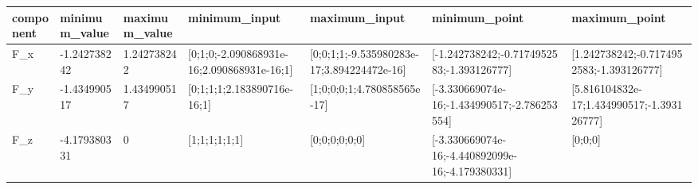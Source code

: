 \begin{tabular}{@{}lllllll@{}}
\toprule
component & minimum\_value & maximum\_value & minimum\_input & maximum\_input & minimum\_point & maximum\_point \\
\midrule
F\_x & -1.242738242 & 1.242738242 & [0;1;0;-2.090868931e-16;2.090868931e-16;1] & [0;0;1;1;-9.535980283e-17;3.894224472e-16] & [-1.242738242;-0.7174952583;-1.393126777] & [1.242738242;-0.7174952583;-1.393126777] \\
F\_y & -1.434990517 & 1.434990517 & [0;1;1;1;2.183890716e-16;1] & [1;0;0;0;1;4.780858565e-17] & [-3.330669074e-16;-1.434990517;-2.786253554] & [5.816104832e-17;1.434990517;-1.393126777] \\
F\_z & -4.179380331 & 0 & [1;1;1;1;1;1] & [0;0;0;0;0;0] & [-3.330669074e-16;-4.440892099e-16;-4.179380331] & [0;0;0] \\
\bottomrule
\end{tabular}
